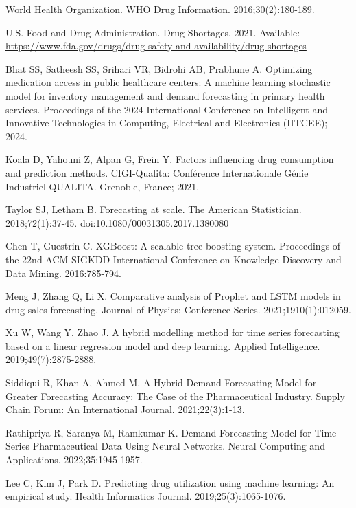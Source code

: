 \documentclass[12pt]{article}
\begin{document}
\begin{thebibliography}{99}

World Health Organization. WHO Drug Information. 2016;30(2):180-189.

U.S. Food and Drug Administration. Drug Shortages. 2021. Available: \url{https://www.fda.gov/drugs/drug-safety-and-availability/drug-shortages}

Bhat SS, Satheesh SS, Srihari VR, Bidrohi AB, Prabhune A. Optimizing medication access in public healthcare centers: A machine learning stochastic model for inventory management and demand forecasting in primary health services. Proceedings of the 2024 International Conference on Intelligent and Innovative Technologies in Computing, Electrical and Electronics (IITCEE); 2024.

Koala D, Yahouni Z, Alpan G, Frein Y. Factors influencing drug consumption and prediction methods. CIGI-Qualita: Conférence Internationale Génie Industriel QUALITA. Grenoble, France; 2021.

Taylor SJ, Letham B. Forecasting at scale. The American Statistician. 2018;72(1):37-45. doi:10.1080/00031305.2017.1380080

Chen T, Guestrin C. XGBoost: A scalable tree boosting system. Proceedings of the 22nd ACM SIGKDD International Conference on Knowledge Discovery and Data Mining. 2016:785-794.

Meng J, Zhang Q, Li X. Comparative analysis of Prophet and LSTM models in drug sales forecasting. Journal of Physics: Conference Series. 2021;1910(1):012059.

Xu W, Wang Y, Zhao J. A hybrid modelling method for time series forecasting based on a linear regression model and deep learning. Applied Intelligence. 2019;49(7):2875-2888.

Siddiqui R, Khan A, Ahmed M. A Hybrid Demand Forecasting Model for Greater Forecasting Accuracy: The Case of the Pharmaceutical Industry. Supply Chain Forum: An International Journal. 2021;22(3):1-13.

Rathipriya R, Saranya M, Ramkumar K. Demand Forecasting Model for Time-Series Pharmaceutical Data Using Neural Networks. Neural Computing and Applications. 2022;35:1945-1957.

Lee C, Kim J, Park D. Predicting drug utilization using machine learning: An empirical study. Health Informatics Journal. 2019;25(3):1065-1076.


\end{thebibliography}
\end{document}
